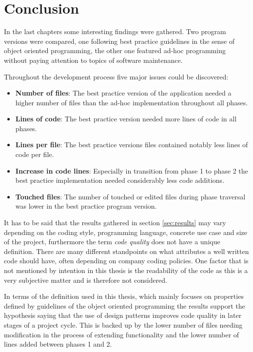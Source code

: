 \chapter{Conclusion}

In the last chapters some interesting findings were gathered. Two program versions were compared, one following best practice guidelines in the sense of object oriented programming, the other one featured ad-hoc programming without paying attention to topics of software maintenance.

Throughout the development process five major issues could be discovered:

\begin{itemize}
	\item \textbf{Number of files}: The best practice version of the application needed a higher number of files than the ad-hoc implementation throughout all phases.
	\item \textbf{Lines of code}: The best practice version needed more lines of code in all phases.
	\item \textbf{Lines per file}: The best practice versions files contained notably less lines of code per file.
	\item \textbf{Increase in code lines}: Especially in transition from phase 1 to phase 2 the best practice implementation needed considerably less code additions.
	\item \textbf{Touched files}: The number of touched or edited files during phase traversal was lower in the best practice program version.
\end{itemize}

It has to be said that the results gathered in section \ref{sec:results} may vary depending on the coding style, programming language, concrete use case and size of the project, furthermore the term \emph{code quality} does not have a unique definition. There are many different standpoints on what attributes a well written code should have, often depending on company coding policies. One factor that is not mentioned by intention in this thesis is the readability of the code as this is a very subjective matter and is therefore not considered. 

In terms of the definition used in this thesis, which mainly focuses on properties defined by guidelines of the object oriented programming the results support the hypothesis saying that the use of design patterns improves code quality in later stages of a project cycle. This is backed up by the lower number of files needing modification in the process of extending functionality and the lower number of lines added between phases 1 and 2. 

